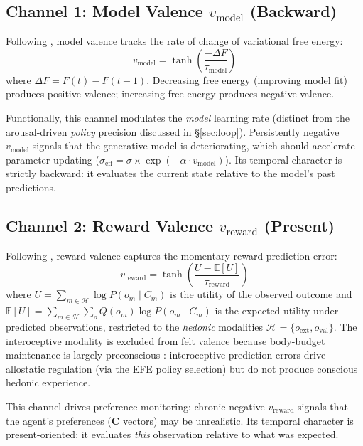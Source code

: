 \documentclass[11pt,a4paper]{article}
\begin{document}
\subsection{Channel 1: Model Valence $v_{\text{model}}$ (Backward)}\label{sec:v_model}

Following \citet{joffily2013emotional}, model valence tracks the rate of change of variational free energy:
\begin{equation}
    v_{\text{model}} = \tanh\!\left(\frac{-\Delta F}{\tau_{\text{model}}}\right)
\end{equation}
where $\Delta F = F(t) - F(t{-}1)$. Decreasing free energy (improving model fit) produces positive valence; increasing free energy produces negative valence.

Functionally, this channel modulates the \emph{model} learning rate (distinct from the arousal-driven \emph{policy} precision discussed in \S\ref{sec:loop}). Persistently negative $v_{\text{model}}$ signals that the generative model is deteriorating, which should accelerate parameter updating ($\sigma_{\text{eff}} = \sigma \times \exp(-\alpha \cdot v_{\text{model}})$). Its temporal character is strictly backward: it evaluates the current state relative to the model's past predictions.

\subsection{Channel 2: Reward Valence $v_{\text{reward}}$ (Present)}\label{sec:v_reward}

Following \citet{pattisapu2024free}, reward valence captures the momentary reward prediction error:
\begin{equation}
    v_{\text{reward}} = \tanh\!\left(\frac{U - \mathbb{E}[U]}{\tau_{\text{reward}}}\right)
\end{equation}
where $U = \sum_{m \in \mathcal{H}} \log P(o_m \mid C_m)$ is the utility of the observed outcome and $\mathbb{E}[U] = \sum_{m \in \mathcal{H}} \sum_o Q(o_m) \log P(o_m \mid C_m)$ is the expected utility under predicted observations, restricted to the \emph{hedonic} modalities $\mathcal{H} = \{o_{\text{ext}}, o_{\text{val}}\}$. The interoceptive modality is excluded from felt valence because body-budget maintenance is largely preconscious \citep{seth2016interoceptive, barrett2017theory}: interoceptive prediction errors drive allostatic regulation (via the EFE policy selection) but do not produce conscious hedonic experience.

This channel drives preference monitoring: chronic negative $v_{\text{reward}}$ signals that the agent's preferences ($\mathbf{C}$ vectors) may be unrealistic. Its temporal character is present-oriented: it evaluates \emph{this} observation relative to what was expected.
\end{document}
